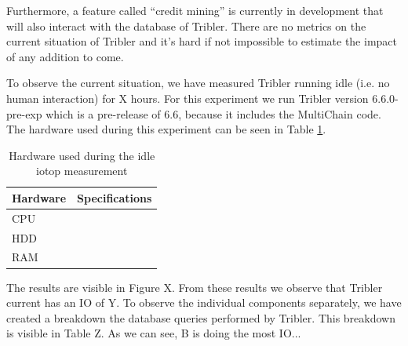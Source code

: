 Furthermore, a feature called ``credit mining'' is currently in development that will also interact with the database of Tribler.
There are no metrics on the current situation of Tribler and it's hard if not impossible to estimate the impact of any addition to come.

To observe the current situation, we have measured Tribler running idle (i.e. no human interaction) for X hours.
For this experiment we run Tribler version 6.6.0-pre-exp which is a pre-release of 6.6, because it includes the MultiChain code.
The hardware used during this experiment can be seen in Table \ref{table:tribler_idle}.

\begin{table}[h]
	\centering
	\begin{tabular}{l|l}
Hardware	& Specifications \\ \hline
CPU			&  \\ 
HDD			&  \\ 
RAM			&  \\
	\end{tabular}
	\caption{Hardware used during the idle iotop measurement}
	\label{table:tribler_idle}
\end{table}

The results are visible in Figure X.
From these results we observe that Tribler current has an IO of Y.
To observe the individual components separately, we have created a breakdown the database queries performed by Tribler.
This breakdown is visible in Table Z.
As we can see, B is doing the most IO... 

